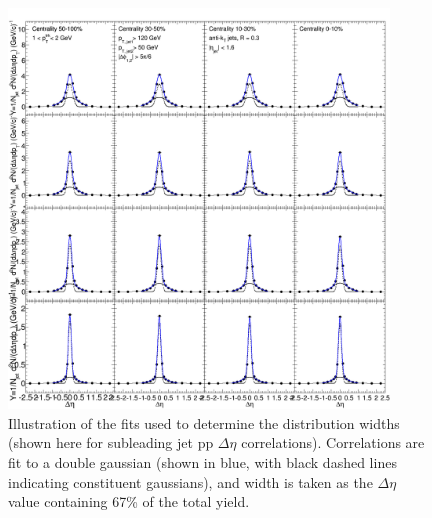 \begin{figure}[hbtp]
\begin{center}

\includegraphics[width=0.9\textwidth]{figures/Appendices/Width_Check_Fits_Eta_pp_SubLeading.png}

\caption[Width determination for pp subleading jets]{Illustration of the fits used to determine the distribution widths (shown here for subleading jet pp $\Delta\eta$ correlations).  Correlations are fit to a double gaussian (shown in blue, with black dashed lines indicating constituent gaussians), and width is taken as the $\Delta\eta$ value containing 67\% of the total yield. }
\label{fig:Width_check_fit_pp_sublead}
\end{center}
\end{figure}

